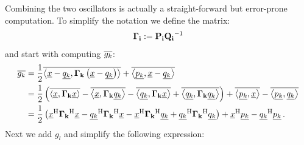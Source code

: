 \documentclass[a4paper,10pt]{article}
\begin{document}
Combining the two oscillators is actually a straight-forward but error-prone computation.
To simplify the notation we define the matrix:
\begin{equation}
  \mathbf{\Gamma_i} := \mathbf{P_i}\mathbf{Q_i}{}^{-1}
\end{equation}
and start with computing $\overline{g_k}$:
\begin{equation*}
\begin{split}
 \overline{g_k}
 & =
 \frac{1}{2}\overline{\left\langle \underline{x}-\underline{q_k} , \mathbf{\Gamma_k} \left(\underline{x}-\underline{q_k}\right) \right\rangle}
 +\overline{\left\langle \underline{p_k} , \underline{x}-\underline{q_k} \right\rangle} \\
 & =
 \frac{1}{2} \left(
                \overline{\left\langle \underline{x} , \mathbf{\Gamma_k} \underline{x} \right\rangle}
               -\overline{\left\langle \underline{x} , \mathbf{\Gamma_k} \underline{q_k} \right\rangle}
               -\overline{\left\langle \underline{q_k} , \mathbf{\Gamma_k} \underline{x} \right\rangle}
               +\overline{\left\langle \underline{q_k} , \mathbf{\Gamma_k} \underline{q_k} \right\rangle}
              \right)
 + \overline{\left\langle \underline{p_k} , \underline{x} \right\rangle}
 - \overline{\left\langle \underline{p_k} , \underline{q_k} \right\rangle} \\
 & =
 \frac{1}{2} \left(
               \underline{x}{}^{\textnormal{H}} \mathbf{\Gamma_k}{}^{\textnormal{H}} \underline{x}
              -\underline{q_k}{}^{\textnormal{H}} \mathbf{\Gamma_k}{}^{\textnormal{H}} \underline{x}
              -\underline{x}{}^{\textnormal{H}} \mathbf{\Gamma_k}{}^{\textnormal{H}} \underline{q_k}
              +\underline{q_k}{}^{\textnormal{H}} \mathbf{\Gamma_k}{}^{\textnormal{H}} \underline{q_k}
              \right)
 + \underline{x}{}^{\textnormal{H}} \underline{p_k} - \underline{q_k}{}^{\textnormal{H}} \underline{p_k} \,.
\end{split}
\end{equation*}
Next we add $g_l$ and simplify the following expression:
\end{document}
